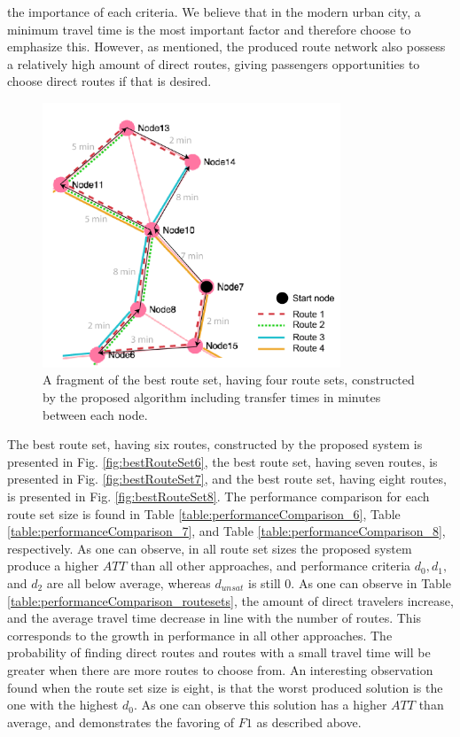 the importance of each criteria. We believe that in the modern urban city, a minimum travel time is the most important factor and therefore choose to emphasize this. However, as mentioned, the produced route network also possess a relatively high amount of direct routes, giving passengers opportunities to choose direct routes if that is desired. 

\begin{figure}[H]
    \begin{center}
    \includegraphics[width=3.5in]{assets/mandl_withTT_utsnitt.png}
    \end{center}
    \caption{A fragment of the best route set, having four route sets, constructed by the proposed algorithm including transfer times in minutes between each node.}
    \label{fig:mandlWithTT} 
\end{figure}

The best route set, having six routes, constructed by the proposed system is presented in Fig. \vref{fig:bestRouteSet6}, the best route set, having seven routes, is presented in Fig. \vref{fig:bestRouteSet7}, and the best route set, having eight routes, is presented in Fig. \vref{fig:bestRouteSet8}. The performance comparison for each route set size is found in Table \vref{table:performanceComparison_6}, Table \vref{table:performanceComparison_7}, and Table \vref{table:performanceComparison_8}, respectively. As one can observe, in all route set sizes the proposed system produce a higher $ATT$ than all other approaches, and performance criteria $d_0, d_1,$ and $d_{2}$ are all below average, whereas $d_{unsat}$ is still 0.   As one can observe in Table \vref{table:performanceComparison_routesets}, the amount of direct travelers increase, and the average travel time decrease in line with the number of routes. This corresponds to the growth in performance in all other approaches. The probability of finding direct routes and routes with a small travel time will be greater when there are more routes to choose from. An interesting observation found when the route set size is eight, is that the worst produced solution is the one with the highest $d_0$. As one can observe this solution has a higher $ATT$ than average, and demonstrates the favoring of $F1$ as described above. 

